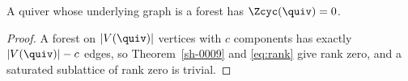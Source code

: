 \begin{corollary}[Trees]\label{sh-000A}
A quiver whose underlying graph is a forest has $\Zcyc(\quiv) = 0$.
\end{corollary}
\begin{proof}
A forest on $|V(\quiv)|$ vertices with $c$ components has exactly $|V(\quiv)| - c$ edges, so Theorem~\ref{sh-0009} and \eqref{eq:rank} give rank zero, and a saturated sublattice of rank zero is trivial.
\end{proof}
